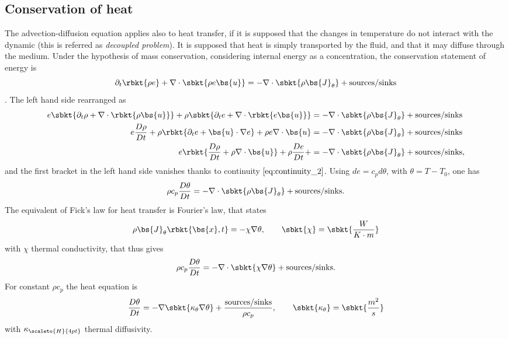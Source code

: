 \subsection{Conservation of heat}
The advection-diffusion equation applies also to heat transfer, if it is supposed that the changes in temperature do not interact with the dynamic (this is referred as \emph{decoupled problem}). It is supposed that heat is simply transported by the fluid, and that it may diffuse through the medium. Under the hypothesis of mass conservation, considering internal energy as a concentration, the conservation statement of energy is
\begin{equation}\label{eq:differential_conservation_energy}
    \partial_{t}\rbkt{\rho e} + \nabla\cdot\sbkt{\rho e\bs{u} } = -\nabla\cdot\sbkt{\rho\bs{J}_{\theta}} + \text{sources/sinks}
\end{equation}.
The left hand side rearranged as
\begin{align*}
    e\sbkt{ \partial_{t}\rho + \nabla\cdot\rbkt{\rho\bs{u}}} + \rho\sbkt{\partial_{t}e + \nabla\cdot\rbkt{e\bs{u}}} &=-\nabla\cdot\sbkt{\rho\bs{J}_{\theta}} + \text{sources/sinks} \\
    e\dfrac{D\rho}{D t} + \rho\rbkt{\partial_{t}e + \bs{u}\cdot\nabla e} + \rho e \nabla\cdot\bs{u}&=-\nabla\cdot\sbkt{\rho\bs{J}_{\theta}} + \text{sources/sinks} \\
    e\rbkt{\dfrac{D\rho}{D t} + \rho\nabla\cdot\bs{u}}+ \rho\dfrac{D e}{D t} + &=-\nabla\cdot\sbkt{\rho\bs{J}_{\theta}} + \text{sources/sinks},
\end{align*}
and the first bracket in the left hand side vanishes thanks to continuity $\eqref{eq:continuity_2}$. Using $de=c_{p}d\theta$, with $\theta = T - T_{0}$, one has
\begin{equation*}
    \rho c_{p}\dfrac{D\theta}{D t} =-\nabla\cdot\sbkt{\rho\bs{J}_{\theta}} + \text{sources/sinks}.
\end{equation*}
The equivalent of Fick's law for heat transfer is Fourier's law, that states
\begin{equation}\label{eq:Fourier_heat}
    \rho\bs{J}_{\theta}\rbkt{\bs{x},t} = -\chi\nabla \theta, \qquad \sbkt{\chi}=\sbkt{\dfrac{W}{K\cdot m}}
\end{equation}
with $\chi$ thermal conductivity, that thus gives
\begin{equation*}
    \rho c_{p}\dfrac{D\theta}{D t} =-\nabla\cdot\sbkt{\chi\nabla \theta} + \text{sources/sinks}.
\end{equation*}
For constant $\rho c_{p}$ the heat equation is
\begin{equation}\label{eq:Heat_equation}
    \dfrac{D\theta}{Dt} = -\nabla\sbkt{\kappa_{\theta}\nabla\theta} + \dfrac{\text{sources/sinks}}{\rho c_{p}},\qquad \sbkt{\kappa_{\theta}}=\sbkt{\dfrac{m^{2}}{s}}
\end{equation}
with $\kappa_{\scaleto{H}{4pt}}$ thermal diffusivity.

